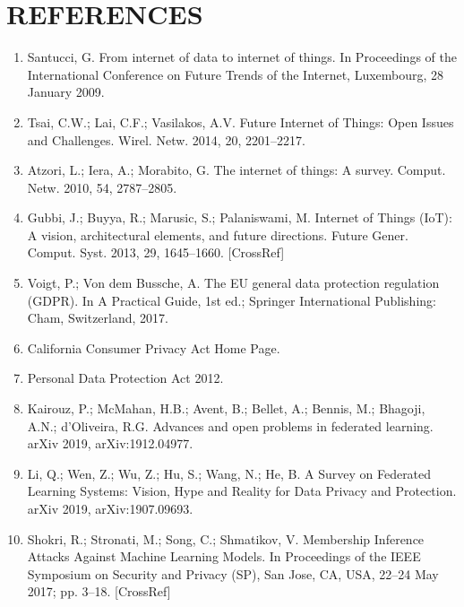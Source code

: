 \documentclass[14pt]{extarticle}
\begin{document}
\section*{REFERENCES}
\begin{enumerate}
    \item \par Santucci, G. From internet of data to internet of things. In Proceedings of the International Conference on Future Trends of the Internet, Luxembourg, 28 January 2009.
    \item \par Tsai, C.W.; Lai, C.F.; Vasilakos, A.V. Future Internet of Things: Open Issues and Challenges. Wirel. Netw. 2014, 20, 2201–2217.
    \item \par Atzori, L.; Iera, A.; Morabito, G. The internet of things: A survey. Comput. Netw. 2010, 54, 2787–2805.
    \item \par Gubbi, J.; Buyya, R.; Marusic, S.; Palaniswami, M. Internet of Things (IoT): A vision, architectural elements, and future directions. Future Gener. Comput. Syst. 2013, 29, 1645–1660. [CrossRef]
    \item \par Voigt, P.; Von dem Bussche, A. The EU general data protection regulation (GDPR). In A Practical Guide, 1st ed.; Springer International Publishing: Cham, Switzerland, 2017.
    \item \par California Consumer Privacy Act Home Page.
    \item \par Personal Data Protection Act 2012.
    \item \par Kairouz, P.; McMahan, H.B.; Avent, B.; Bellet, A.; Bennis, M.; Bhagoji, A.N.; d’Oliveira, R.G. Advances and open problems in federated learning. arXiv 2019, arXiv:1912.04977.
    \item \par Li, Q.; Wen, Z.; Wu, Z.; Hu, S.; Wang, N.; He, B. A Survey on Federated Learning Systems: Vision, Hype and Reality for Data Privacy and Protection. arXiv 2019, arXiv:1907.09693.
    \item \par Shokri, R.; Stronati, M.; Song, C.; Shmatikov, V. Membership Inference Attacks Against Machine Learning Models. In Proceedings of the IEEE Symposium on Security and Privacy (SP), San Jose, CA, USA, 22–24 May 2017; pp. 3–18. [CrossRef]

\end{enumerate}
\end{document}
